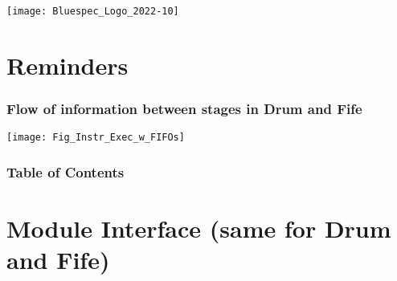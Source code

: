 


\date{L16: RISC-V: The Fife pipelined CPU}





\begin{frame}
 \titlepage

 \begin{center}
  \texttt{[image: Bluespec\_Logo\_2022-10]}
 \end{center}

\end{frame}


\section{Reminders}




\begin{frame}
\frametitle{Flow of information between stages in Drum and Fife}

\label{Slide_Instr_Steps}

\footnotesize

\begin{center}
 \texttt{[image: Fig\_Instr\_Exec\_w\_FIFOs]}
\end{center}

\end{frame}


\begin{frame}
\frametitle{Table of Contents}

\tableofcontents

\end{frame}


\section{Module Interface (same for Drum and Fife)}

